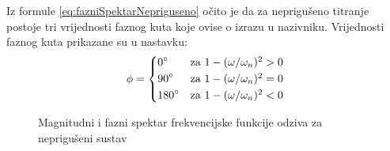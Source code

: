 Iz formule \eqref{eq:fazniSpektarNepriguseno} očito je da za neprigušeno titranje
postoje tri vrijednosti faznog kuta koje ovise o izrazu u nazivniku. Vrijednosti
faznog kuta prikazane su u nastavku:
\[
    \phi = \begin{dcases*}
            0\degree   & za $1-(\omega/\omega_n)^2 > 0$\\ %
            90\degree  & za $1-(\omega/\omega_n)^2 = 0$\\ %
            180\degree & za $1-(\omega/\omega_n)^2 < 0$\\ %
        \end{dcases*}
\]

\begin{figure}[H]
    \begin{subfigure}{1\textwidth}
        
    \end{subfigure}
    \vfill
    \begin{subfigure}{1\textwidth}
        
    \end{subfigure}
    \caption{Magnitudni i fazni spektar frekvencijske funkcije odziva za neprigušeni
    sustav}
    \label{fig:frf-nepriguseno}
\end{figure}


